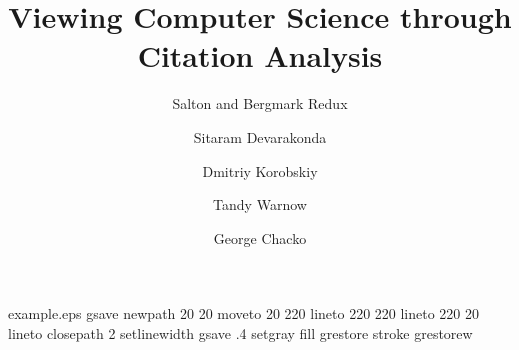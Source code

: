 %
%
%
%
%
\begin{filecontents*}{example.eps}
gsave
newpath
  20 20 moveto
  20 220 lineto
  220 220 lineto
  220 20 lineto
closepath
2 setlinewidth
gsave
  .4 setgray fill
grestore
stroke
grestorew
\end{filecontents*}
%
\RequirePackage{fix-cm}
%
\documentclass[smallextended]{svjour3}       %
%
\smartqed  %
%
\usepackage{graphicx}
\usepackage{xcolor}
\usepackage{listings}
\usepackage{comment}
%
%
%
%
%


\title{Viewing Computer Science through Citation Analysis}
\subtitle{Salton and Bergmark Redux}

\author{Sitaram Devarakonda  \and
	Dmitriy Korobskiy \and
        Tandy Warnow \and
        George Chacko }


